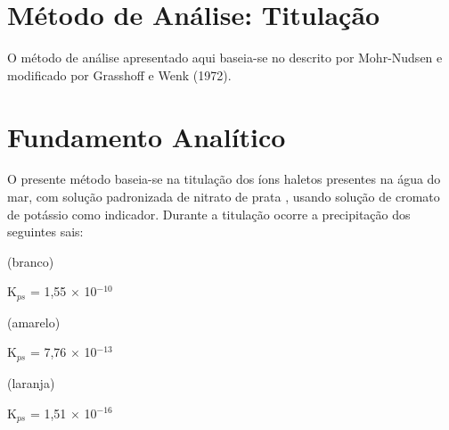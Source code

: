 \documentclass[a4paper,10pt]{SelfArx}
\affiliation{~} %
\begin{document}
\flushbottom %
\maketitle %
\renewcommand{\contentsname}{Conteúdo}
\tableofcontents %
\thispagestyle{empty} %

\section*{Método de Análise: Titulação} %
O método de análise apresentado aqui baseia-se no descrito por Mohr-Nudsen e modificado por Grasshoff e Wenk (1972).
\section{Fundamento Analítico}

O presente método baseia-se na titulação dos íons haletos 
presentes na água do mar, com solução pa\-dro\-ni\-za\-da de nitrato de prata ,
usando solução de cromato de potássio  como indicador.
Durante a titulação ocorre a precipitação dos seguintes sais:
\vspace{0.15cm}

 (branco)

K$_{ps}$ = 1,55 $\times$ 10$^{-10}$
\vspace{0.15cm}

 (amarelo)   

K$_{ps}$ = 7,76 $\times$ 10$^{-13}$
\vspace{0.15cm}

 (laranja)

K$_{ps}$ = 1,51 $\times$ 10$^{-16}$
\vspace{0.15cm}
\end{document}
